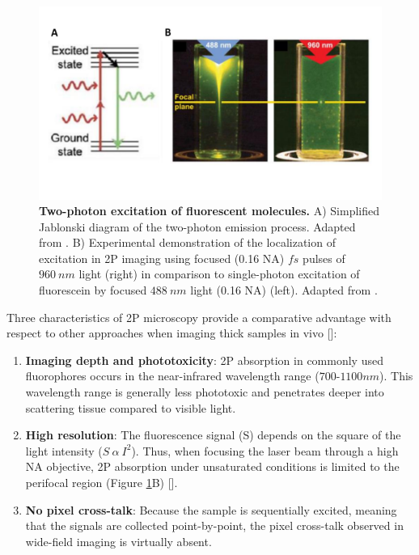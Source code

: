 \begin{figure}
    \centering
    \includegraphics[trim={0 90 0 0},clip, width=\textwidth]{Figures/Chapter1/intro_fig_optical_imaging.pdf}
    \caption[Two-photon excitation of fluorescent molecules.]{\textbf{Two-photon excitation of fluorescent molecules.} 
    A) Simplified Jablonski diagram of the two-photon emission process. Adapted from \cite{svoboda2006}. 
    B) Experimental demonstration of the localization of excitation in 2P imaging using focused (0.16 NA) $fs$ pulses of $960\ nm$ light (right) in comparison to single-photon excitation of fluorescein by focused $488\ nm$ light (0.16 NA) (left). 
    Adapted from \cite{zipfel2003}.}
    \label{fig:chap1:optical_imaging}
\end{figure}

Three characteristics of 2P microscopy provide a comparative advantage with respect to other approaches when imaging thick samples in vivo [\cite{helmchen2005}]: 
\begin{enumerate}
    \item \textbf{Imaging depth and phototoxicity}: 2P absorption in commonly used fluorophores occurs in the near-infrared wavelength range ($700$-$1100 nm$). 
    This wavelength range is generally less phototoxic and penetrates deeper into scattering tissue compared to visible light.
    \item \textbf{High resolution}: The fluorescence signal (S) depends on the square of the light intensity ($S\ \alpha \ I^2$). Thus, when focusing the laser beam through a high NA objective, 2P absorption under unsaturated conditions is limited to the perifocal region (Figure \ref{fig:chap1:optical_imaging}B) [\cite{nagy2005}].
    \item \textbf{No pixel cross-talk}: Because the sample is sequentially excited, meaning that the signals are collected point-by-point, the pixel cross-talk observed in wide-field imaging is virtually absent.
\end{enumerate}

